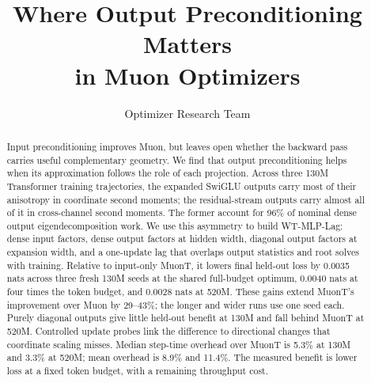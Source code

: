 \documentclass[11pt]{article}
\title{Where Output Preconditioning Matters\\in Muon Optimizers}
\author{Optimizer Research Team}
\newcommand{\mname}[1]{#1}
\begin{document}
\maketitle

\begin{abstract}
Input preconditioning improves Muon, but leaves open whether the backward pass carries useful complementary geometry. We find that output preconditioning helps when its approximation follows the role of each projection. Across three 130M Transformer training trajectories, the expanded SwiGLU outputs carry most of their anisotropy in coordinate second moments; the residual-stream outputs carry almost all of it in cross-channel second moments. The former account for 96\% of nominal dense output eigendecomposition work. We use this asymmetry to build \mname{WT-MLP-Lag}: dense input factors, dense output factors at hidden width, diagonal output factors at expansion width, and a one-update lag that overlaps output statistics and root solves with training. Relative to input-only \mname{MuonT}, it lowers final held-out loss by 0.0035 nats across three fresh 130M seeds at the shared full-budget optimum, 0.0040 nats at four times the token budget, and 0.0028 nats at 520M. These gains extend MuonT's improvement over Muon by 29--43\%; the longer and wider runs use one seed each. Purely diagonal outputs give little held-out benefit at 130M and fall behind MuonT at 520M. Controlled update probes link the difference to directional changes that coordinate scaling misses. Median step-time overhead over MuonT is 5.3\% at 130M and 3.3\% at 520M; mean overhead is 8.9\% and 11.4\%. The measured benefit is lower loss at a fixed token budget, with a remaining throughput cost.
\end{abstract}










\FloatBarrier



\clearpage
\appendix
{}

\end{document}
